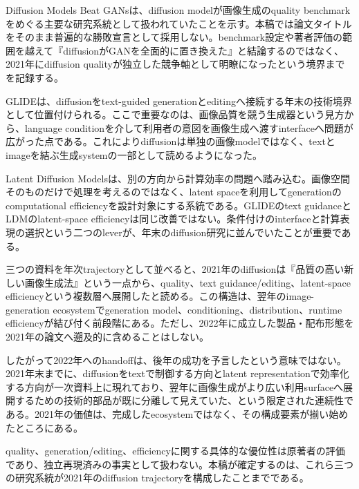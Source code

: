 
Diffusion Models Beat GANsは、diffusion modelが画像生成のquality benchmarkをめぐる主要な研究系統として扱われていたことを示す。本稿では論文タイトルをそのまま普遍的な勝敗宣言として採用しない。benchmark設定や著者評価の範囲を越えて『diffusionがGANを全面的に置き換えた』と結論するのではなく、2021年にdiffusion qualityが独立した競争軸として明瞭になったという境界までを記録する。\autocite{src-11a149a699a0}


GLIDEは、diffusionをtext-guided generationとeditingへ接続する年末の技術境界として位置付けられる。ここで重要なのは、画像品質を競う生成器という見方から、language conditionを介して利用者の意図を画像生成へ渡すinterfaceへ問題が広がった点である。これによりdiffusionは単独の画像modelではなく、textとimageを結ぶ生成systemの一部として読めるようになった。\autocite{src-50244427230b}


Latent Diffusion Modelsは、別の方向から計算効率の問題へ踏み込む。画像空間そのものだけで処理を考えるのではなく、latent spaceを利用してgenerationのcomputational efficiencyを設計対象にする系統である。GLIDEのtext guidanceとLDMのlatent-space efficiencyは同じ改善ではない。条件付けのinterfaceと計算表現の選択という二つのleverが、年末のdiffusion研究に並んでいたことが重要である。\autocite{src-a4561c635fe6}


三つの資料を年次trajectoryとして並べると、2021年のdiffusionは『品質の高い新しい画像生成法』という一点から、quality、text guidance/editing、latent-space efficiencyという複数層へ展開したと読める。この構造は、翌年のimage-generation ecosystemでgeneration model、conditioning、distribution、runtime efficiencyが結び付く前段階にある。ただし、2022年に成立した製品・配布形態を2021年の論文へ遡及的に含めることはしない。\autocite{src-11a149a699a0,src-50244427230b,src-a4561c635fe6}


したがって2022年へのhandoffは、後年の成功を予言したという意味ではない。2021年末までに、diffusionをtextで制御する方向とlatent representationで効率化する方向が一次資料上に現れており、翌年に画像生成がより広い利用surfaceへ展開するための技術的部品が既に分離して見えていた、という限定された連続性である。2021年の価値は、完成したecosystemではなく、その構成要素が揃い始めたところにある。\autocite{src-50244427230b,src-a4561c635fe6}


\begin{claimboundary}
quality、generation/editing、efficiencyに関する具体的な優位性は原著者の評価であり、独立再現済みの事実として扱わない。本稿が確定するのは、これら三つの研究系統が2021年のdiffusion trajectoryを構成したことまでである。\autocite{src-11a149a699a0,src-50244427230b,src-a4561c635fe6}
\end{claimboundary}
